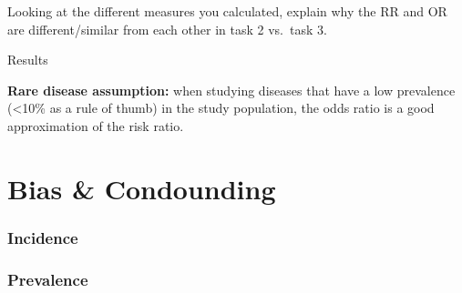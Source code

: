 \documentclass[
  letterpaper,
  paper=6in:9in,
  pagesize=pdftex,
  headinclude=on,
  footinclude=on,
  12pt]{scrbook}
\begin{document}
Looking at the different measures you calculated, explain why the RR and
OR are different/similar from each other in task 2 vs.~task 3.

Results

\textbf{Rare disease assumption:} when studying diseases that have a low
prevalence (\textless10\% as a rule of thumb) in the study population,
the odds ratio is a good approximation of the risk ratio.


\hypertarget{sec-bias}{%
\chapter{Bias \& Condounding}\label{sec-bias}}

\hypertarget{incidence-1}{%
\subsection{Incidence}\label{incidence-1}}

\hypertarget{prevalence-1}{%
\subsection{Prevalence}\label{prevalence-1}}


\backmatter
\end{document}

